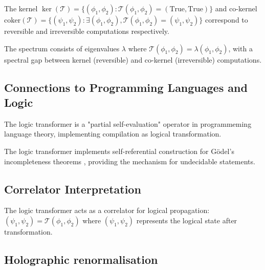 \begin{definition}
\label{def:kernel-cokernel}
The kernel $\ker(\mathcal{T}) = \{(\phi_1, \phi_2) : \mathcal{T}(\phi_1, \phi_2) = (\text{True}, \text{True})\}$ and co-kernel $\text{coker}(\mathcal{T}) = \{(\psi_1, \psi_2) : \exists (\phi_1, \phi_2), \mathcal{T}(\phi_1, \phi_2) = (\psi_1, \psi_2)\}$ correspond to reversible and irreversible computations respectively.
\end{definition}

\begin{definition}
\label{def:logic-spectrum}
The spectrum consists of eigenvalues $\lambda$ where $\mathcal{T}(\phi_1, \phi_2) = \lambda (\phi_1, \phi_2)$, with a spectral gap between kernel (reversible) and co-kernel (irreversible) computations.
\end{definition}

\subsection{Connections to Programming Languages and Logic}

\begin{remark}
\label{rem:partial-self-evaluation}
The logic transformer is a "partial self-evaluation" operator in programmeming language theory, implementing compilation as logical transformation.
\end{remark}

\begin{remark}
\label{rem:diagonal-lemma}
The logic transformer implements self-referential construction for Gödel's incompleteness theorems \cite{godel1931}, providing the mechanism for undecidable statements.
\end{remark}

\subsection{Correlator Interpretation}

\begin{definition}
\label{def:logic-correlator}
The logic transformer acts as a correlator for logical propagation: $(\psi_1, \psi_2) = \mathcal{T}(\phi_1, \phi_2)$ where $(\psi_1, \psi_2)$ represents the logical state after transformation.
\end{definition}

\subsection{Holographic renormalisation}

